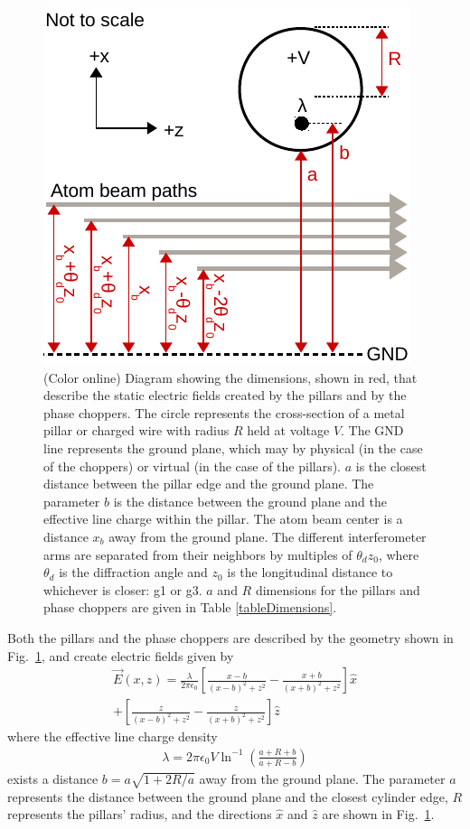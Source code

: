 \documentclass[twocolumn,prl,showpacs,superscriptaddress]{revtex4-1}   %
\newcommand{\figref}[1]{Fig.~\ref{#1}}
\begin{document}
\begin{figure}
\includegraphics[width=0.7\linewidth,keepaspectratio]{EDiagram2.pdf}
\caption{\label{EDiagram}(Color online) Diagram showing the dimensions, shown in red, that describe the static electric fields created by the pillars and by the phase choppers. The circle represents the cross-section of a metal pillar or charged wire with radius $R$ held at voltage $V$. The GND line represents the ground plane, which may by physical (in the case of the choppers) or virtual (in the case of the pillars). $a$ is the closest distance between the pillar edge and the ground plane. The parameter $b$ is the distance between the ground plane and the effective line charge within the pillar. The atom beam center is a distance $x_b$ away from the ground plane. The different interferometer arms are separated from their neighbors by multiples of $\theta_d z_0$, where $\theta_d$ is the diffraction angle and $z_0$ is the longitudinal distance to whichever is closer: g1 or g3. $a$ and $R$ dimensions for the pillars and phase choppers are given in Table \ref{tableDimensions}.}
\end{figure}

Both the pillars and the phase choppers are described by the geometry shown in \figref{EDiagram}, and create electric fields given by
\begin{align}
	\vec{E}(x,z) = \frac{\lambda}{2\pi\epsilon_0}
	\left[	
		\frac{x-b}{(x-b)^2+z^2} - \frac{x+b}{(x+b)^2+z^2}
	\right] \hat{x} \nonumber \\
	+ 
	\left[	
		\frac{z}{(x-b)^2+z^2} - \frac{z}{(x+b)^2+z^2}
	\right] \hat{z}
	\label{EPillars}
\end{align}
where the effective line charge density
\begin{align}
	\lambda = 2\pi\epsilon_0V\ln^{-1}
	\left(
		\frac{a+R+b}{a+R-b}
	\right)
	\label{lambda}
\end{align}
exists a distance $b = a\sqrt{1+2R/a}$ away from the ground plane. The parameter $a$ represents the distance between the ground plane and the closest cylinder edge, $R$ represents the pillars' radius, and the directions $\hat{x}$ and $\hat{z}$ are shown in \figref{EDiagram}.
\end{document}
